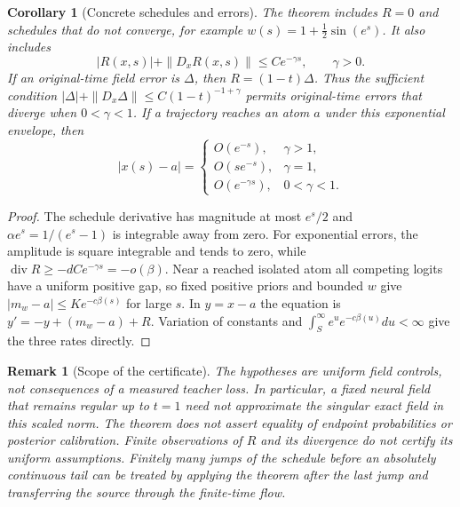 \documentclass[11pt]{article}
\newtheorem{corollary}{Corollary}
\newtheorem{remark}{Remark}
\newcommand{\diver}{\operatorname{div}}
\begin{document}
\begin{corollary}[Concrete schedules and errors]\label{cor:examples}
The theorem includes $R=0$ and schedules that do not converge, for example
$w(s)=1+\frac12\sin(e^s)$. It also includes
\[
 |R(x,s)|+\|D_xR(x,s)\|\le C e^{-\gamma s},\qquad \gamma>0.
\]
If an original-time field error is $\Delta$, then $R=(1-t)\Delta$.
Thus the sufficient condition
$|\Delta|+\|D_x\Delta\|\le C(1-t)^{-1+\gamma}$ permits original-time
errors that diverge when $0<\gamma<1$.
If a trajectory reaches an atom $a$ under this exponential envelope, then
\[
 |x(s)-a|=
 \begin{cases}
 O(e^{-s}),&\gamma>1,\\
 O(se^{-s}),&\gamma=1,\\
 O(e^{-\gamma s}),&0<\gamma<1.
 \end{cases}
\]
\end{corollary}
\begin{proof}
The schedule derivative has magnitude at most $e^s/2$ and
$\alpha e^s=1/(e^s-1)$ is integrable away from zero. For exponential errors,
the amplitude is square integrable and tends to zero, while
$\diver R\ge-dCe^{-\gamma s}=-o(\beta)$.
Near a reached isolated atom all competing logits have a uniform positive
gap, so fixed positive priors and bounded $w$ give
$|m_w-a|\le K e^{-c\beta(s)}$ for large $s$. In $y=x-a$ the equation is
$y'=-y+(m_w-a)+R$. Variation of constants and
$\int_S^\infty e^u e^{-c\beta(u)}du<\infty$ give the three rates directly.
\end{proof}

\begin{remark}[Scope of the certificate]
The hypotheses are uniform field controls, not consequences of a measured
teacher loss. In particular, a fixed neural field that remains regular up to
$t=1$ need not approximate the singular exact field in this scaled norm.
The theorem does not assert equality of endpoint probabilities or posterior
calibration. Finite observations of $R$ and its divergence do not certify its
uniform assumptions. Finitely many jumps of the schedule before an
absolutely continuous tail can be treated by applying the theorem after the
last jump and transferring the source through the finite-time flow.
\end{remark}
\end{document}
